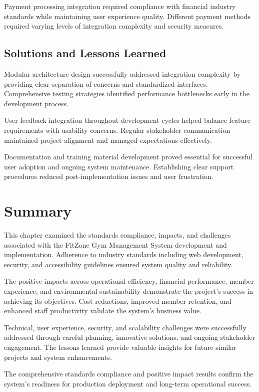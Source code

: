 \documentclass[12pt,a4paper]{report}
\begin{document}
Payment processing integration required compliance with financial industry standards while maintaining user experience quality. Different payment methods required varying levels of integration complexity and security measures.

\subsection{Solutions and Lessons Learned}

Modular architecture design successfully addressed integration complexity by providing clear separation of concerns and standardized interfaces. Comprehensive testing strategies identified performance bottlenecks early in the development process.

User feedback integration throughout development cycles helped balance feature requirements with usability concerns. Regular stakeholder communication maintained project alignment and managed expectations effectively.

Documentation and training material development proved essential for successful user adoption and ongoing system maintenance. Establishing clear support procedures reduced post-implementation issues and user frustration.

\section{Summary}
\label{sec:standards-summary}

This chapter examined the standards compliance, impacts, and challenges associated with the FitZone Gym Management System development and implementation. Adherence to industry standards including web development, security, and accessibility guidelines ensured system quality and reliability.

The positive impacts across operational efficiency, financial performance, member experience, and environmental sustainability demonstrate the project's success in achieving its objectives. Cost reductions, improved member retention, and enhanced staff productivity validate the system's business value.

Technical, user experience, security, and scalability challenges were successfully addressed through careful planning, innovative solutions, and ongoing stakeholder engagement. The lessons learned provide valuable insights for future similar projects and system enhancements.

The comprehensive standards compliance and positive impact results confirm the system's readiness for production deployment and long-term operational success.
\end{document}
